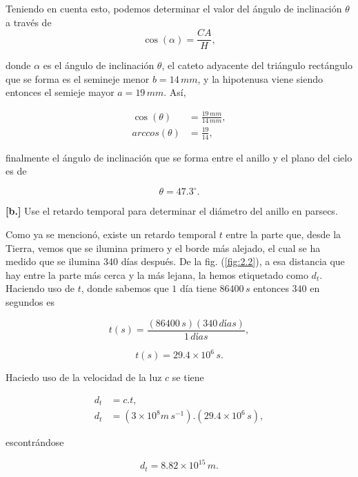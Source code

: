 \documentclass[paper=a4, fontsize=10pt]{scrartcl} %
\begin{document}
Teniendo en cuenta esto, podemos determinar el valor del ángulo de inclinación $\theta$ a través de 
$$\cos (\alpha) = \frac{CA}{H},$$

donde $\alpha$ es el ángulo de inclinación $\theta$, el cateto adyacente del triángulo rectángulo que se forma es el semineje menor $b=14\, mm$, y la hipotenusa viene siendo entonces el semieje mayor $a=19 \,mm$. Así, 

\begin{align*}
\cos(\theta) & = \frac{19 \, mm}{14 \, mm}, \\
arccos(\theta) & = \frac{19}{14},
\end{align*} 

finalmente el ángulo de inclinación que se forma entre el anillo y el plano del cielo es de 

\begin{equation} \label{eq:2.7} 
\theta = 47.3^{\circ}. 
\end{equation}

\vspace{0.3cm}

{\bf{[b.]}} Use el retardo temporal para determinar el diámetro del anillo en parsecs. 

\vspace{0.3cm} 

Como ya se mencionó, existe un retardo temporal $t$ entre la parte que, desde la Tierra, vemos que se ilumina primero y el borde más alejado, el cual se ha medido que se ilumina 340 días después. De la fig.  (\ref{fig:2.2}), a esa distancia que hay entre la parte más cerca y la más lejana, la hemos etiquetado como $d_t$. Haciendo uso de $t$, donde sabemos que $1$ día tiene $86400 \,s$ entonces $340$ en segundos es


$$t(s) = \frac{(86400 \,s)(340 \, días)}{1 \, días}, $$

$$ t(s) = 29.4 \times 10^6 \, s.$$ 



Haciedo uso de la velocidad de la luz $c$ se tiene 

\begin{align*}
d_t & = c. t, \\
d_t & = (3 \times 10^8 m\, s^{-1}).(29.4 \times 10^6 \,s),
\end{align*}

escontrándose 

\begin{equation} \label{eq:2.8} 
d_t = 8.82 \times 10^{15} \, m.
\end{equation}
\end{document}
